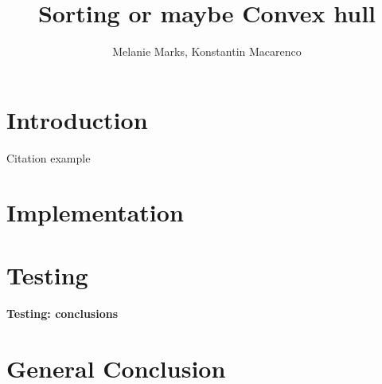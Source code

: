 \documentclass{IEEEtran}
\title{Sorting or maybe Convex hull}
\author{
    Melanie Marks, Konstantin Macarenco\\
}
\begin{document}
\maketitle
\thispagestyle{plain}
\pagestyle{plain}
\begin{abstract}

\end{abstract}
\tableofcontents
\section{Introduction}\label{sec:intro}
Citation example\cite{ABOOK}
\section{Implementation}\label{sec:Implementation}

\section{Testing}\label{sec:testing}

\textbf{Testing: conclusions}



\section{General Conclusion}



\end{document}
